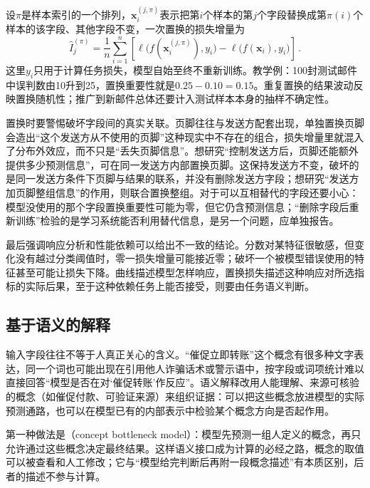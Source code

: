 设$\pi$是样本索引的一个排列，$\bm x_i^{(j,\pi)}$表示把第$i$个样本的第$j$个字段替换成第$\pi(i)$个样本的该字段、其他字段不变，一次置换的损失增量为
\begin{equation}
 \widehat I_j^{(\pi)}
 =\frac1n\sum_{i=1}^n\left[
 \ell\bigl(f(\bm{x}_i^{(j,\pi)}),y_i\bigr)
 -\ell\bigl(f(\bm{x}_i),y_i\bigr)\right]\, .
 \label{eq:interpretability-permutation}
\end{equation}
这里$y_i$只用于计算任务损失，模型自始至终不重新训练。教学例：100封测试邮件中误判数由10升到25，置换重要性就是$0.25-0.10=0.15$。重复置换的结果波动反映置换随机性；推广到新邮件总体还要计入测试样本本身的抽样不确定性。

置换时要警惕破坏字段间的真实关联。页脚往往与发送方配套出现，单独置换页脚会造出“这个发送方从不使用的页脚”这种现实中不存在的组合，损失增量里就混入了分布外效应，而不只是“丢失页脚信息”。想研究“控制发送方后，页脚还能额外提供多少预测信息”，可在同一发送方内部置换页脚。这保持发送方不变，破坏的是同一发送方条件下页脚与结果的联系，并没有删除发送方字段；想研究“发送方加页脚整组信息”的作用，则联合置换整组。对于可以互相替代的字段还要小心：模型没使用的那个字段置换重要性可能为零，但它仍含预测信息；“删除字段后重新训练”检验的是学习系统能否利用替代信息，是另一个问题，应单独报告。

最后强调响应分析和性能依赖可以给出不一致的结论。分数对某特征很敏感，但变化没有越过分类阈值时，零一损失增量可能接近零；破坏一个被模型错误使用的特征甚至可能让损失下降。曲线描述模型怎样响应，置换损失描述这种响应对所选指标的实际后果，至于这种依赖任务上能否接受，则要由任务语义判断。

\subsection{基于语义的解释}
\label{sec:interpretability-global-concepts}

输入字段往往不等于人真正关心的含义。“催促立即转账”这个概念有很多种文字表达，同一个词也可能出现在引用他人诈骗话术或警示语中，按字段或词项统计难以直接回答“模型是否在对‘催促转账’作反应”。语义解释改用人能理解、来源可核验的概念（如催促付款、可验证来源）来组织证据：可以把这些概念放进模型的实际预测通路，也可以在模型已有的内部表示中检验某个概念方向是否起作用。

第一种做法是（concept bottleneck model）：模型先预测一组人定义的概念，再只允许通过这些概念决定最终结果。这样语义接口成为计算的必经之路，概念的取值可以被查看和人工修改；它与“模型给完判断后再附一段概念描述”有本质区别，后者的描述不参与计算。

